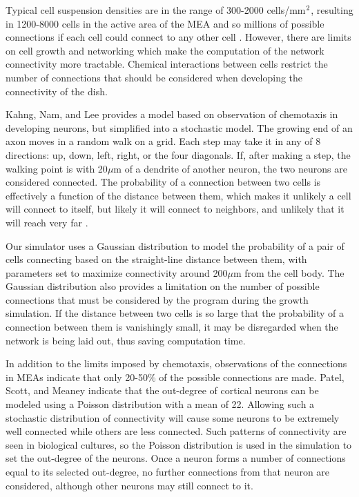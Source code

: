 \documentclass[letterpaper]{article}
\newcommand{\superscript}[1]{\ensuremath{^{\textrm{\scriptsize{#1}}}}}
\begin{document}

Typical cell suspension densities are in the range of 300-2000 cells/mm\superscript{2}, resulting in 1200-8000 cells in the active area of the MEA and so millions of possible connections if each cell could connect to any other cell \cite{wagenaar2006extremely}.
However, there are limits on cell growth and networking which make the computation of the network connectivity more tractable. 
Chemical interactions between cells restrict the number of connections that should be considered when developing the connectivity of the dish. 

Kahng, Nam, and Lee  provides a model based on observation of chemotaxis in developing neurons, but simplified into a stochastic model. 
The growing end of an axon moves in a random walk on a grid. 
Each step may take it in any of 8 directions: up, down, left, right, or the four diagonals.
If, after making a step, the walking point is with 20$\mu$m of a dendrite of another neuron, the two neurons are considered connected. 
The probability of a connection between two cells is effectively a function of the distance between them, which makes it unlikely a cell will connect to itself, but likely it will connect to neighbors, and unlikely that it will reach very far \cite{Segev2000185}. 

Our simulator uses a Gaussian distribution to model the probability of a pair of cells connecting based on the straight-line distance between them, with parameters set to maximize connectivity around 200$\mu$m from the cell body. 
The Gaussian distribution also provides a limitation on the number of possible connections that must be considered by the program during the growth simulation. 
If the distance between two cells is so large that the probability of a connection between them is vanishingly small, it may be disregarded when the network is being laid out, thus saving computation time. 

In addition to the limits imposed by chemotaxis, observations of the connections in MEAs indicate that only 20-50\% of the possible connections are made. 
Patel, Scott, and Meaney  indicate that the out-degree of cortical neurons can be modeled using a Poisson distribution with a mean of 22. 
Allowing such a stochastic distribution of connectivity will cause some neurons to be extremely well connected while others are less connected. 
Such patterns of connectivity are seen in biological cultures, so the Poisson distribution is used in the simulation to set the out-degree of the neurons. 
Once a neuron forms a number of connections equal to its selected out-degree, no further connections from that neuron are considered, although other neurons may still connect to it.
\end{document}
